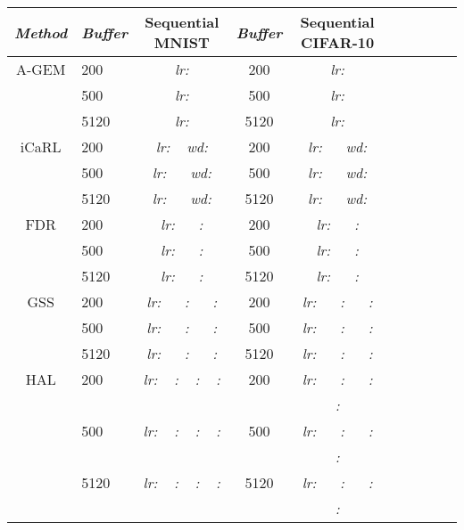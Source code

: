 \documentclass{article}
\begin{document}
\begin{table}[H]
\centering\begin{tabular}{| Sl | Sc | Sl | Sc | Sl |}
\hline
\textit{Method} & \textit{Buffer} & \textbf{Sequential MNIST} & \textit{Buffer} & \textbf{Sequential CIFAR-10} \\
\hline
A-GEM   & 200    & \textit{lr:}    & 200  & \textit{lr:}   \\
        & 500    & \textit{lr:}    & 500  & \textit{lr:}   \\
        & 5120   & \textit{lr:}    & 5120 & \textit{lr:}   \\
iCaRL   & 200    & \textit{lr:}  ~ \textit{wd:}  & 200  & \textit{lr:}  ~~ \textit{wd:}  \\
        & 500    & \textit{lr:}  ~~ \textit{wd:}  & 500  & \textit{lr:}  ~~ \textit{wd:} \\
        & 5120   & \textit{lr:}  ~~ \textit{wd:}  & 5120 & \textit{lr:}  ~~ \textit{wd:} \\
FDR     & 200    & \textit{lr:}    ~~ \textit{:}  & 200  & \textit{lr:}   ~~ \textit{:}  \\
        & 500    & \textit{lr:}    ~~ \textit{:}  & 500  & \textit{lr:}   ~~ \textit{:}  \\
        & 5120   & \textit{lr:}    ~~ \textit{:}  & 5120 & \textit{lr:}   ~~ \textit{:}  \\
GSS     & 200    & \textit{lr:}   ~~ \textit{:}  ~~ \textit{:}  & 200  & \textit{lr:}  ~~ \textit{:}  ~~ \textit{:} \\
        & 500    & \textit{lr:}   ~~ \textit{:}  ~~ \textit{:}  & 500  & \textit{lr:}   ~~ \textit{:}  ~~ \textit{:} \\
        & 5120   & \textit{lr:}   ~~ \textit{:}  ~~ \textit{:}  & 5120 & \textit{lr:}   ~~ \textit{:}  ~~ \textit{:} \\
HAL     & 200    & \textit{lr:}   ~ \textit{:}  ~ \textit{:}  ~ \textit{:}   & 200  & \textit{lr:}  ~~            \textit{:}  ~~ \textit{:}  \\
        & & & & \textit{:}  \\
        & 500    & \textit{lr:}   ~ \textit{:}  ~ \textit{:}  ~ \textit{:}   & 500  & \textit{lr:}   ~~ \textit{:}  ~~ \textit{:}  \\
        & & & & \textit{:}  \\
        & 5120   & \textit{lr:}   ~ \textit{:}  ~ \textit{:}  ~ \textit{:}  & 5120 & \textit{lr:}  ~~ \textit{:}  ~~ \textit{:}  \\
        & & & & \textit{:}  \\

\end{tabular}
\end{table}
\end{document}
